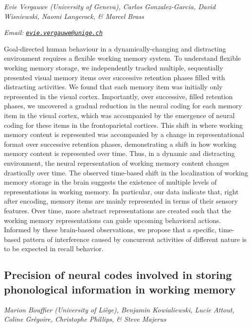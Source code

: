 \documentclass[
  12pt,
]{book}
\begin{document}
\emph{Evie Vergauwe (University of Geneva), Carlos Gonzalez-Garcia, David Wisniewski, Naomi Langerock, \& Marcel Brass}

\emph{Email: \href{mailto:evie.vergauwe@unige.ch}{\nolinkurl{evie.vergauwe@unige.ch}}}

Goal-directed human behaviour in a dynamically-changing and distracting environment requires a flexible working memory system. To understand flexible working memory storage, we independently tracked multiple, sequentially presented visual memory items over successive retention phases filled with distracting activities. We found that each memory item was initially only represented in the visual cortex. Importantly, over successive, filled retention phases, we uncovered a gradual reduction in the neural coding for each memory item in the visual cortex, which was accompanied by the emergence of neural coding for these items in the frontoparietal cortices. This shift in where working memory content is represented was accompanied by a change in representational format over successive retention phases, demonstrating a shift in how working memory content is represented over time. Thus, in a dynamic and distracting environment, the neural representation of working memory content changes drastically over time. The observed time-based shift in the localization of working memory storage in the brain suggests the existence of multiple levels of representations in working memory. In particular, our data indicate that, right after encoding, memory items are mainly represented in terms of their sensory features. Over time, more abstract representations are created such that the working memory representations can guide upcoming behavioral actions. Informed by these brain-based observations, we propose that a specific, time-based pattern of interference caused by concurrent activities of different nature is to be expected in recall behavior.

\hypertarget{precision-of-neural-codes-involved-in-storing-phonological-information-in-working-memory}{%
\subsection{Precision of neural codes involved in storing phonological information in working memory}\label{precision-of-neural-codes-involved-in-storing-phonological-information-in-working-memory}}

\emph{Marion Bouffier (University of Liège), Benjamin Kowialiewski, Lucie Attout, Coline Grègoire, Christophe Phillips, \& Steve Majerus}
\end{document}
